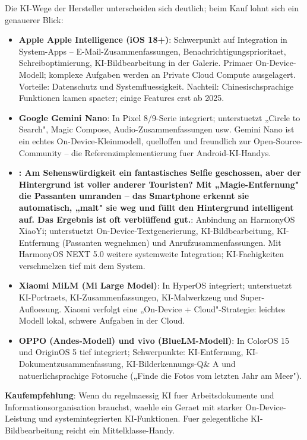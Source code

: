 
Die KI-Wege der Hersteller unterscheiden sich deutlich; beim Kauf lohnt sich ein genauerer Blick:

\begin{itemize}
  \item \textbf{Apple Apple Intelligence (iOS 18+)}: Schwerpunkt auf Integration in System-Apps – E-Mail-Zusammenfassungen, Benachrichtigungsprioritaet, Schreiboptimierung, KI-Bildbearbeitung in der Galerie. Primaer On-Device-Modell; komplexe Aufgaben werden an Private Cloud Compute ausgelagert. Vorteile: Datenschutz und Systemfluessigkeit. Nachteil: Chinesischsprachige Funktionen kamen spaeter; einige Features erst ab 2025.
  \item \textbf{Google Gemini Nano}: In Pixel 8/9-Serie integriert; unterstuetzt „Circle to Search", Magic Compose, Audio-Zusammenfassungen usw. Gemini Nano ist ein echtes On-Device-Kleinmodell, quelloffen und freundlich zur Open-Source-Community – die Referenzimplementierung fuer Android-KI-Handys.
  \item \textbf{: Am Sehenswürdigkeit ein fantastisches Selfie geschossen, aber der Hintergrund ist voller anderer Touristen? Mit „Magie-Entfernung" die Passanten umranden – das Smartphone erkennt sie automatisch, „malt" sie weg und füllt den Hintergrund intelligent auf. Das Ergebnis ist oft verblüffend gut.}: Anbindung an HarmonyOS XiaoYi; unterstuetzt On-Device-Textgenerierung, KI-Bildbearbeitung, KI-Entfernung (Passanten wegnehmen) und Anrufzusammenfassungen. Mit HarmonyOS NEXT 5.0 weitere systemweite Integration; KI-Faehigkeiten verschmelzen tief mit dem System.
  \item \textbf{Xiaomi MiLM (Mi Large Model)}: In HyperOS integriert; unterstuetzt KI-Portraets, KI-Zusammenfassungen, KI-Malwerkzeug und Super-Aufloesung. Xiaomi verfolgt eine „On-Device + Cloud"-Strategie: leichtes Modell lokal, schwere Aufgaben in der Cloud.
  \item \textbf{OPPO (Andes-Modell) und vivo (BlueLM-Modell)}: In ColorOS 15 und OriginOS 5 tief integriert; Schwerpunkte: KI-Entfernung, KI-Dokumentzusammenfassung, KI-Bilderkennungs-Q\& A und natuerlichsprachige Fotosuche („Finde die Fotos vom letzten Jahr am Meer").
\end{itemize}

\textbf{Kaufempfehlung}: Wenn du regelmaessig KI fuer Arbeitsdokumente und Informationsorganisation brauchst, waehle ein Geraet mit starker On-Device-Leistung und systemintegrierten KI-Funktionen. Fuer gelegentliche KI-Bildbearbeitung reicht ein Mittelklasse-Handy.

